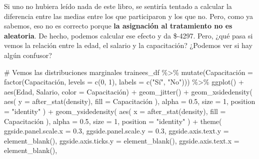 \documentclass[
  letterpaper,
  DIV=11,
  numbers=noendperiod,
  oneside]{scrreprt}
\newenvironment{Shaded}{\begin{snugshade}}{\end{snugshade}}
\newcommand{\AttributeTok}[1]{\textcolor[rgb]{0.40,0.45,0.13}{#1}}
\newcommand{\CommentTok}[1]{\textcolor[rgb]{0.37,0.37,0.37}{#1}}
\newcommand{\DecValTok}[1]{\textcolor[rgb]{0.68,0.00,0.00}{#1}}
\newcommand{\FloatTok}[1]{\textcolor[rgb]{0.68,0.00,0.00}{#1}}
\newcommand{\FunctionTok}[1]{\textcolor[rgb]{0.28,0.35,0.67}{#1}}
\newcommand{\NormalTok}[1]{\textcolor[rgb]{0.00,0.23,0.31}{#1}}
\newcommand{\OtherTok}[1]{\textcolor[rgb]{0.00,0.23,0.31}{#1}}
\newcommand{\SpecialCharTok}[1]{\textcolor[rgb]{0.37,0.37,0.37}{#1}}
\newcommand{\StringTok}[1]{\textcolor[rgb]{0.13,0.47,0.30}{#1}}
\begin{document}
Si uno no hubiera leído nada de este libro, se sentiría tentado a
calcular la diferencia entre las medias entre los que participaron y los
que no. Pero, como ya sabemos, eso no es correcto porque \textbf{la
asignación al tratamiento no es aleatoria}. De hecho, podemos calcular
ese efecto y da \$-4297. Pero, ¿qué pasa si vemos la relación entre la
edad, el salario y la capacitación? ¿Podemos ver si hay algún confusor?

\begin{Shaded}
\begin{Highlighting}[]
\CommentTok{\# Vemos las distribuciones marginales}
\NormalTok{trainees\_df }\SpecialCharTok{\%\textgreater{}\%}
  \FunctionTok{mutate}\NormalTok{(Capacitación }\OtherTok{=} \FunctionTok{factor}\NormalTok{(Capacitación,}
                               \AttributeTok{levels =} \FunctionTok{c}\NormalTok{(}\DecValTok{0}\NormalTok{, }\DecValTok{1}\NormalTok{),}
                               \AttributeTok{labels =} \FunctionTok{c}\NormalTok{(}\StringTok{"Sí"}\NormalTok{, }\StringTok{"No"}\NormalTok{))) }\SpecialCharTok{\%\textgreater{}\%}
  \FunctionTok{ggplot}\NormalTok{() }\SpecialCharTok{+}
  \FunctionTok{aes}\NormalTok{(Edad, Salario, }\AttributeTok{color =}\NormalTok{ Capacitación) }\SpecialCharTok{+}
  \FunctionTok{geom\_jitter}\NormalTok{() }\SpecialCharTok{+}
  \FunctionTok{geom\_xsidedensity}\NormalTok{(}
    \FunctionTok{aes}\NormalTok{(}
      \AttributeTok{y =} \FunctionTok{after\_stat}\NormalTok{(density),}
      \AttributeTok{fill =}\NormalTok{ Capacitación}
\NormalTok{    ),}
    \AttributeTok{alpha =} \FloatTok{0.5}\NormalTok{,}
    \AttributeTok{size =} \DecValTok{1}\NormalTok{,}
    \AttributeTok{position =} \StringTok{"identity"}
\NormalTok{  ) }\SpecialCharTok{+}
  \FunctionTok{geom\_ysidedensity}\NormalTok{(}
    \FunctionTok{aes}\NormalTok{(}
      \AttributeTok{x =} \FunctionTok{after\_stat}\NormalTok{(density),}
      \AttributeTok{fill =}\NormalTok{ Capacitación}
\NormalTok{    ),}
    \AttributeTok{alpha =} \FloatTok{0.5}\NormalTok{,}
    \AttributeTok{size =} \DecValTok{1}\NormalTok{,}
    \AttributeTok{position =} \StringTok{"identity"}
\NormalTok{  ) }\SpecialCharTok{+} 
  \FunctionTok{theme}\NormalTok{(}
    \AttributeTok{ggside.panel.scale.x =} \FloatTok{0.3}\NormalTok{,}
    \AttributeTok{ggside.panel.scale.y =} \FloatTok{0.3}\NormalTok{,}
    \AttributeTok{ggside.axis.text.y =} \FunctionTok{element\_blank}\NormalTok{(),}
    \AttributeTok{ggside.axis.ticks.y =} \FunctionTok{element\_blank}\NormalTok{(),}
    \AttributeTok{ggside.axis.text.x =} \FunctionTok{element\_blank}\NormalTok{(),}

\end{Highlighting}
\end{Shaded}
\end{document}
